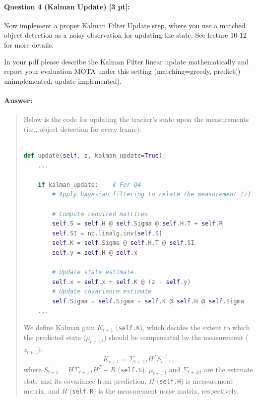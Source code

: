 \documentclass[11pt]{article}
\begin{document}
\paragraph{Question 4 (Kalman Update) [3 pt]:}
Now implement a proper Kalman Filter Update step, where you use a matched object detection as a noisy observation for updating the state. See lecture 10-12 for more details.

In your pdf please describe the Kalman Filter linear update mathematically and report your evaluation MOTA under this setting (matching=greedy, predict() unimplemented, update implemented).
\paragraph{Answer:} 
\begin{quote}


Below is the code for updating the tracker's state upon the measurements (i.e., object detection for every frame).

\begin{lstlisting}[language=Python, basicstyle=\scriptsize]

def update(self, z, kalman_update=True):
    ...

    if kalman_update:    # For Q4
        # Apply bayesian filtering to relate the measurement (z) to the state (self.x)
        
        # Compute required matrices
        self.S = self.H @ self.Sigma @ self.H.T + self.R
        self.SI = np.linalg.inv(self.S)
        self.K = self.Sigma @ self.H.T @ self.SI
        self.y = self.H @ self.x

        # Update state estimate
        self.x = self.x + self.K @ (z - self.y)
        # Update covariance estimate
        self.Sigma = self.Sigma - self.K @ self.H @ self.Sigma
    ...

\end{lstlisting}

We define Kalman gain $ K_{t+1} $ (\texttt{self.K}), which decides the extent to which the predicted state ($ \mu_{t+1 | t} $) should be compensated by the measurement ($ z_{t+1} $):
\[ K_{t+1} = \Sigma_{t+1 | t} H^T S_{t+1}^{-1}, \]
where $ S_{t+1} = H \Sigma_{t+1 | t} H^T + R $ (\texttt{self.S}). $ \mu_{t+1 | t} $ and $ \Sigma_{t+1 | t} $ are the estimate state and its covariance from prediction, $ H $ (\texttt{self.H}) is measurement matrix, and $ R $ (\texttt{self.R}) is the measurement noise matrix, respectively.


\end{quote}
\end{document}
